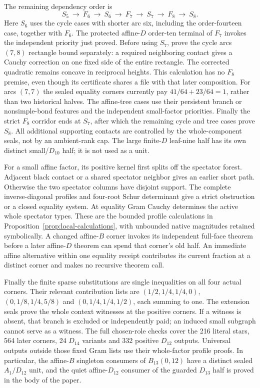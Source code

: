 \documentclass[11pt]{article}
\theoremstyle{remark}\newtheorem{remark}[theorem]{Remark}
\begin{document}
The remaining dependency order is
\[
 S_5\ \longrightarrow\ F_6\ \longrightarrow\ S_6
 \ \longrightarrow\ F_7\ \longrightarrow\ S_7
 \ \longrightarrow\ F_8\ \longrightarrow\ S_8.
\]
Here $S_6$ uses the cycle cases with shorter arc six, including the
order-fourteen case, together with $F_6$. The protected affine-$D$
order-ten terminal of $F_7$ invokes the independent priority just
proved. Before using $S_7$, prove the cycle arcs $(7,8)$ rectangle
bound separately: a required neighboring contact gives a Cauchy
correction on one fixed side of the entire rectangle. The corrected
quadratic remains concave in reciprocal heights. This calculation
has no $F_8$ premise, even though its certificate shares a file with
that later composition. For arcs $(7,7)$ the sealed equality corners
currently pay $41/64+23/64=1$, rather than two historical halves.
The affine-tree cases use their persistent branch or nonsimple-bond
features and the independent small-factor priorities. Finally the
strict $F_8$ corridor ends at $S_7$, after which the remaining cycle
and tree cases prove $S_8$. All additional supporting contacts are
controlled by the whole-component seals, not by an ambient-rank cap.
The large finite-$D$ leaf-nine half has its own distinct small/$D_{10}$
half; it is not used as a unit.

For a small affine factor, its positive kernel first splits off
the spectator forest. Adjacent black contact or a shared spectator
neighbor gives an earlier short path. Otherwise the two spectator
columns have disjoint support. The complete inverse-diagonal
profiles and four-root Schur determinant give a strict obstruction
or a closed equality system. At equality Gram Cauchy determines
the active whole spectator types. These are the bounded profile
calculations in Proposition~\ref{prop:local-calculations}, with
unbounded native magnitudes retained symbolically. A changed
affine-$B$ corner invokes its independent full-face theorem before
a later affine-$D$ theorem can spend that corner's old half.
An immediate affine alternative within one equality receipt
contributes its current fraction at a distinct corner and makes
no recursive theorem call.

Finally the finite sparse substitutions are single inequalities
on all four actual corners. Their relevant contribution lists
are $(1/2,1/4,1/4,0)$, $(0,1/8,1/4,5/8)$ and
$(0,1/4,1/4,1/2)$, each summing to one. The extension seals
prove the whole context witnesses at the positive corners.
If a witness is absent, that branch is excluded or independently
paid; an induced small subgraph cannot serve as a witness.
The full chosen-role checks cover the 216 literal stars, 564
later corners, 24 $D_{14}$ variants and 332 positive $D_{12}$
outputs. Universal outputs outside those fixed Gram lists use
their whole-factor profile proofs. In particular, the affine-$B$
singleton consumers of $B_{13}(0,12)$ have a distinct sealed
$A_1/D_{12}$ unit, and the quiet affine-$D_{12}$ consumer of the
guarded $D_{13}$ half is proved in the body of the paper.
\end{document}
